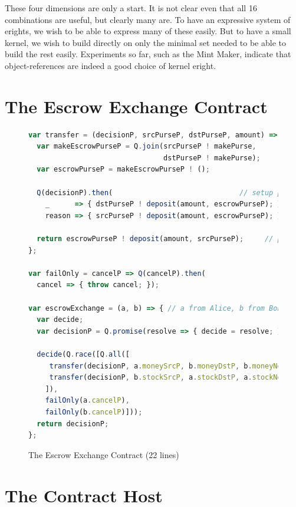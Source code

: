 \documentclass{llncs}
\begin{document}
These four dimensions are only a start. It is not clear even that all 16 combinations are useful, but clearly many are. To have an expressive system of erights, we wish to be able to express many of these easily. But to have a small kernel, we wish to build directly on only the minimal set needed to be able to build the rest easily. Experiments so far, such as the Mint Maker, indicate that object-references are indeed a good choice of kernel eright.

\section{The Escrow Exchange Contract}

\begin{figure}[htbp]
\begin{center}
\begin{lstlisting}[language=javascript]
var transfer = (decisionP, srcPurseP, dstPurseP, amount) => {
  var makeEscrowPurseP = Q.join(srcPurseP ! makePurse, 
                                dstPurseP ! makePurse);
  var escrowPurseP = makeEscrowPurseP ! ();

  Q(decisionP).then(                              // setup phase 2
    _      => { dstPurseP ! deposit(amount, escrowPurseP); },
    reason => { srcPurseP ! deposit(amount, escrowPurseP); });

  return escrowPurseP ! deposit(amount, srcPurseP);     // phase 1
};

var failOnly = cancelP => Q(cancelP).then(
  cancel => { throw cancel; });

var escrowExchange = (a, b) => { // a from Alice, b from Bob
  var decide;
  var decisionP = Q.promise(resolve => { decide = resolve; });

  decide(Q.race([Q.all([
     transfer(decisionP, a.moneySrcP, b.moneyDstP, b.moneyNeeded),
     transfer(decisionP, b.stockSrcP, a.stockDstP, a.stockNeeded)
    ]), 
    failOnly(a.cancelP), 
    failOnly(b.cancelP)]));
  return decisionP;
};
\end{lstlisting}
\caption{The Escrow Exchange Contract (22 lines)}
\label{escrowExchange}
\end{center}
\end{figure}



\section{The Contract Host}
\end{document}
